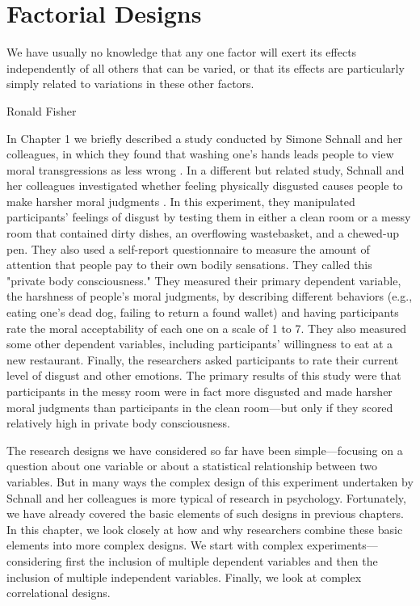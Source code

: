 \chapter{Factorial Designs}

We have usually no knowledge that any one factor will exert its effects independently of all others that can be varied, or that its effects are particularly simply related to variations in these other factors.

Ronald Fisher

In Chapter 1 we briefly described a study conducted by Simone Schnall and her colleagues, in which they found that washing one's hands leads people to view moral transgressions as less wrong \citep{schnall_clean_2008}. In a different but related study, Schnall and her colleagues investigated whether feeling physically disgusted causes people to make harsher moral judgments \citep{schnall_disgust_2008}. In this experiment, they manipulated participants' feelings of disgust by testing them in either a clean room or a messy room that contained dirty dishes, an overflowing wastebasket, and a chewed-up pen. They also used a self-report questionnaire to measure the amount of attention that people pay to their own bodily sensations. They called this "private body consciousness." They measured their primary dependent variable, the harshness of people's moral judgments, by describing different behaviors (e.g., eating one's dead dog, failing to return a found wallet) and having participants rate the moral acceptability of each one on a scale of 1 to 7. They also measured some other dependent variables, including participants' willingness to eat at a new restaurant. Finally, the researchers asked participants to rate their current level of disgust and other emotions. The primary results of this study were that participants in the messy room were in fact more disgusted and made harsher moral judgments than participants in the clean room---but only if they scored relatively high in private body consciousness.

The research designs we have considered so far have been simple---focusing on a question about one variable or about a statistical relationship between two variables. But in many ways the complex design of this experiment undertaken by Schnall and her colleagues is more typical of research in psychology. Fortunately, we have already covered the basic elements of such designs in previous chapters. In this chapter, we look closely at how and why researchers combine these basic elements into more complex designs. We start with complex experiments---considering first the inclusion of multiple dependent variables and then the inclusion of multiple independent variables. Finally, we look at complex correlational designs.

